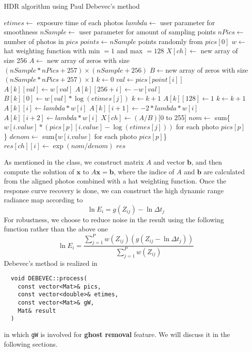 \documentclass[11pt]{article}
\begin{document}
\begin{algorithm}
\caption{HDR algorithm using Paul Debevec's method \cite{ref:debevec}}
\begin{algorithmic}[1]
\State $etimes\gets$ exposure time of each photos
\State $lambda\gets$ user parameter for smoothness
\State $nSample\gets$ user parameter for amount of sampling points
\State $nPics\gets$ number of photos in $pics$
\State $points\gets nSample$ points randomly from $pics[0]$
	\State $w\gets$ hat weighting function with min $=1$ and max $=128$
		\State $X[ch]\gets$ new array of size 256
		\State $A\gets$ new array of zeros with size $(nSample*nPics+257)\times(nSample+256)$
		\State $B\gets$new array of zeros with size $(nSample*nPics+257)\times 1$
		\State $k\gets 0$
				\State $val\gets pics[point[i]]$
				\State $A[k][val]\gets w[val]$
				\State $A[k][256+i]\gets-w[val]$
				\State $B[k][0]\gets w[val]*\log(etimes[j])$
				\State $k\gets k+1$
			\EndFor
		\EndFor
		\State $A[k][128]\gets 1$
			\State $k\gets k+1$
			\State $A[k][i]\gets lambda*w[i]$
			\State $A[k][i+1]\gets -2*lambda*w[i]$
			\State $A[k][i+2]\gets lambda*w[i]$
		\EndFor
		\State $X[ch]\gets (A/B)$[0 to 255]
	\EndFor	
			\State $nom\gets$ sum\{$w[i.value]*(pics[p][i.value]-\log(etimes[j]))$ for each photo $pics[p]$\}
			\State $denom\gets$ sum\{$w[i.value]$ for each photo $pics[p]$\}
			\State $res[ch][i]\gets\exp(nom/denom)$
		\EndFor
	\EndFor
	\State\Return $res$
\EndFunction
\end{algorithmic}
\end{algorithm}

As mentioned in the class, we construct matrix $A$ and vector $\textbf{b}$, and then compute the solution of $\textbf{x}$ to $A\textbf{x}=\textbf{b}$, where the indice of $A$ and $\textbf{b}$ are calculated from the aligned photos combined with a hat weighting function. Once the response curve recovery is done, we can construct the high dynamic range radiance map according to \cite{ref:debevec}
$$\ln E_i=g(Z_{ij})-\ln\Delta t_j$$
For robustness, we choose to reduce noise in the result using the following function rather than the above one
$$\ln E_i=\frac{\sum_{j=1}^P w(Z_{ij})(g(Z_{ij}-\ln\Delta t_j))}{\sum_{j=1}^Pw(Z_{ij})}$$
Debevec's method is realized in 
\begin{lstlisting}
  void DEBEVEC::process(
    const vector<Mat>& pics, 
    const vector<double>& etimes, 
    const vector<Mat>& gW, 
    Mat& result
  )
\end{lstlisting}
in which \texttt{gW} is involved for \textbf{ghost removal} feature. We will discuss it in the following sections.
\end{document}
